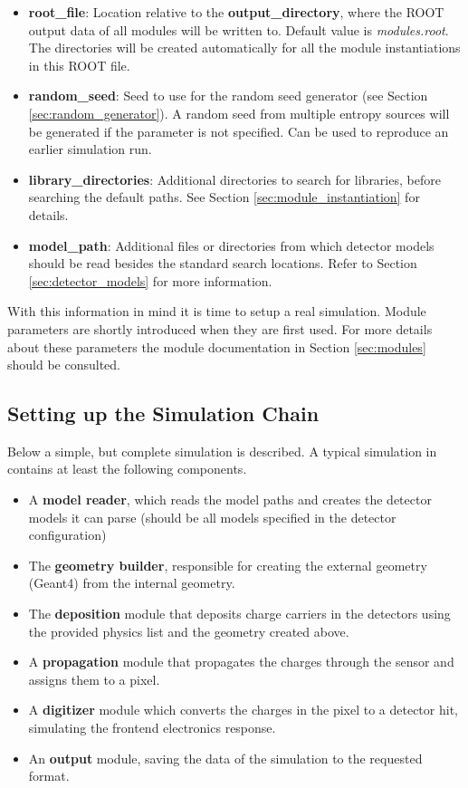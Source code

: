 \begin{itemize}
\item \textbf{root\_file}: Location relative to the \textbf{output\_directory}, where the ROOT output data of all modules will be written to. Default value is \textit{modules.root}. The directories will be created automatically for all the module instantiations in this ROOT file.
\item \textbf{random\_seed}: Seed to use for the random seed generator (see Section \ref{sec:random_generator}). A random seed from multiple entropy sources will be generated if the parameter is not specified. Can be used to reproduce an earlier simulation run.
\item \textbf{library\_directories}: Additional directories to search for libraries, before searching the default paths. See Section \ref{sec:module_instantiation} for details.
\item \textbf{model\_path}: Additional files or directories from which detector models should be read besides the standard search locations. Refer to Section \ref{sec:detector_models} for more information.
\end{itemize}

With this information in mind it is time to setup a real simulation. Module parameters are shortly introduced when they are first used. For more details about these parameters the module documentation in Section \ref{sec:modules} should be consulted.

\subsection{Setting up the Simulation Chain}
\label{sec:setting_up_simulation_chain}
Below a simple, but complete simulation is described. A typical simulation in \apsq contains at least the following components.
\begin{itemize}
\item A \textbf{model reader}, which reads the model paths and creates the detector models it can parse (should be all models specified in the detector configuration)
\item The \textbf{geometry builder}, responsible for creating the external geometry (Geant4) from the internal geometry.
\item The \textbf{deposition} module that deposits charge carriers in the detectors using the provided physics list and the geometry created above.
\item A \textbf{propagation} module that propagates the charges through the sensor and assigns them to a pixel.
\item A \textbf{digitizer} module which converts the charges in the pixel to a detector hit, simulating the frontend electronics response.
\item An \textbf{output} module, saving the data of the simulation to the requested format.
\end{itemize}

